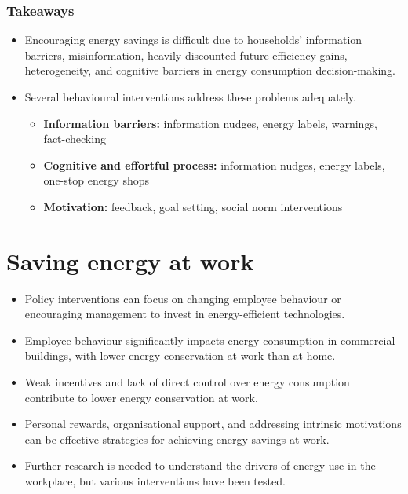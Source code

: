 \documentclass[
  11pt,
]{article}
\begin{document}
\hypertarget{takeaways}{%
\subsubsection*{Takeaways}\label{takeaways}}

\begin{itemize}
\item
  Encouraging energy savings is difficult due to households' information
  barriers, misinformation, heavily discounted future efficiency gains,
  heterogeneity, and cognitive barriers in energy consumption
  decision-making.
\item
  Several behavioural interventions address these problems adequately.

  \begin{itemize}
  \item
    \textbf{Information barriers:} information nudges, energy labels,
    warnings, fact-checking
  \item
    \textbf{Cognitive and effortful process:} information nudges, energy
    labels, one-stop energy shops
  \item
    \textbf{Motivation:} feedback, goal setting, social norm
    interventions
  \end{itemize}
\end{itemize}

\hypertarget{sec:work}{%
\section{Saving energy at work}\label{sec:work}}

\begin{keypoints}
\begin{itemize}[leftmargin=*,labelsep=5mm]
    \item Policy interventions can focus on changing employee behaviour or encouraging management to invest in energy-efficient technologies.
    \item Employee behaviour significantly impacts energy consumption in commercial buildings, with lower energy conservation at work than at home.
    \item Weak incentives and lack of direct control over energy consumption contribute to lower energy conservation at work.
    \item Personal rewards, organisational support, and addressing intrinsic motivations can be effective strategies for achieving energy savings at work.
    \item Further research is needed to understand the drivers of energy use in the workplace, but various interventions have been tested.
\end{itemize}
\end{keypoints}
\end{document}
